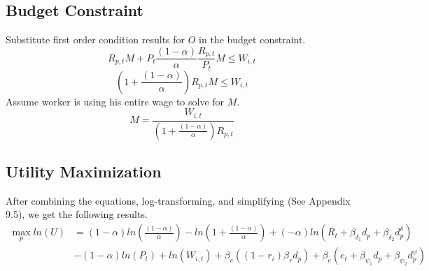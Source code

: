 \documentclass{article}
\begin{document}
\subsection{Budget Constraint}
Substitute first order condition results for $O$ in the budget constraint.
$$R_{p,t}M + P_t\frac{(1 - \alpha)}{\alpha}\frac{R_{p,t}}{P_t}M \leq W_{i,t}$$
$$(1 + \frac{(1 - \alpha)}{\alpha})R_{p,t}M \leq W_{i,t}$$
Assume worker is using his entire wage to solve for $M$.
$$M = \frac{W_{i,t}}{(1 + \frac{(1 - \alpha)}{\alpha})R_{p,t}}$$
\subsection{Utility Maximization}
After combining the equations, log-transforming, and simplifying (See Appendix 9.5), we get the following results.
\begin{equation*}
    \begin{aligned}
    \max_{p} ln(U) & = (1-\alpha)ln(\frac{(1 - \alpha)}{\alpha}) - ln(1 + \frac{(1 - \alpha)}{\alpha}) + (-\alpha)ln(R_{t} + \beta_{\delta_1} d_p + \beta_{\delta_2} d_p^\delta)\\
    &  - (1-\alpha)ln(P_t) + ln(W_{i,t}) + \beta_c ((1-r_i)\beta_r d_p) + \beta_e (e_{t} + \beta_{\psi_1} d_p + \beta_{\psi_2} d_p^\psi)
    \end{aligned}
\end{equation*}
\end{document}
